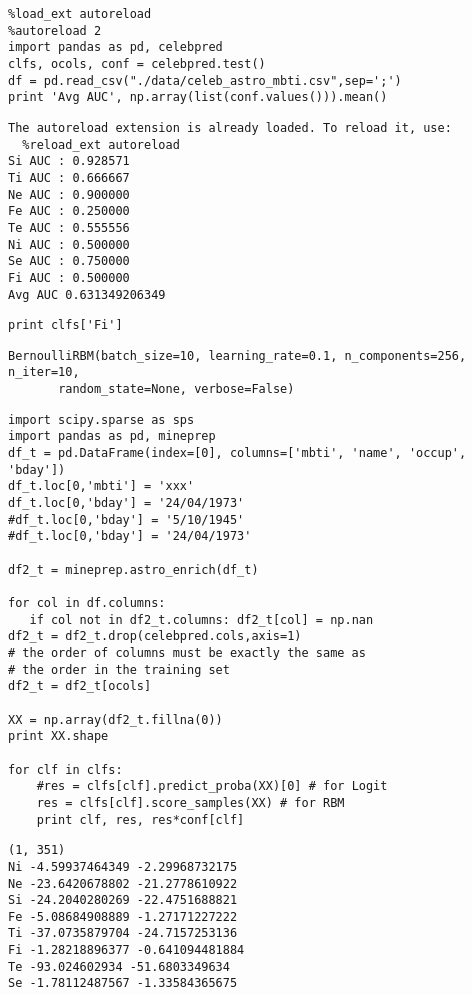 \documentclass[12pt,fleqn]{article}\usepackage{../common}
\begin{document}
\begin{verbatim}
%load_ext autoreload
%autoreload 2
import pandas as pd, celebpred
clfs, ocols, conf = celebpred.test()
df = pd.read_csv("./data/celeb_astro_mbti.csv",sep=';')
print 'Avg AUC', np.array(list(conf.values())).mean()
\end{verbatim}

\begin{verbatim}
The autoreload extension is already loaded. To reload it, use:
  %reload_ext autoreload
Si AUC : 0.928571
Ti AUC : 0.666667
Ne AUC : 0.900000
Fe AUC : 0.250000
Te AUC : 0.555556
Ni AUC : 0.500000
Se AUC : 0.750000
Fi AUC : 0.500000
Avg AUC 0.631349206349
\end{verbatim}

\begin{verbatim}
print clfs['Fi']
\end{verbatim}

\begin{verbatim}
BernoulliRBM(batch_size=10, learning_rate=0.1, n_components=256, n_iter=10,
       random_state=None, verbose=False)
\end{verbatim}

\begin{verbatim}
import scipy.sparse as sps
import pandas as pd, mineprep
df_t = pd.DataFrame(index=[0], columns=['mbti', 'name', 'occup', 'bday'])
df_t.loc[0,'mbti'] = 'xxx'
df_t.loc[0,'bday'] = '24/04/1973'
#df_t.loc[0,'bday'] = '5/10/1945'
#df_t.loc[0,'bday'] = '24/04/1973'

df2_t = mineprep.astro_enrich(df_t)

for col in df.columns: 
   if col not in df2_t.columns: df2_t[col] = np.nan
df2_t = df2_t.drop(celebpred.cols,axis=1)
# the order of columns must be exactly the same as 
# the order in the training set
df2_t = df2_t[ocols] 

XX = np.array(df2_t.fillna(0))
print XX.shape

for clf in clfs: 
    #res = clfs[clf].predict_proba(XX)[0] # for Logit
    res = clfs[clf].score_samples(XX) # for RBM
    print clf, res, res*conf[clf]
\end{verbatim}

\begin{verbatim}
(1, 351)
Ni -4.59937464349 -2.29968732175
Ne -23.6420678802 -21.2778610922
Si -24.2040280269 -22.4751688821
Fe -5.08684908889 -1.27171227222
Ti -37.0735879704 -24.7157253136
Fi -1.28218896377 -0.641094481884
Te -93.024602934 -51.6803349634
Se -1.78112487567 -1.33584365675
\end{verbatim}
\end{document}
